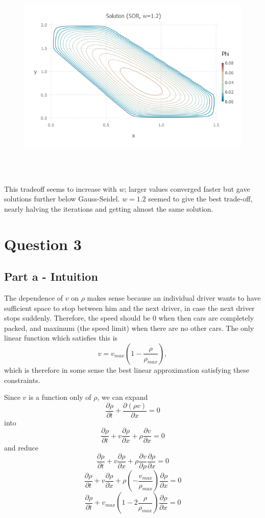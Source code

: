 \documentclass{article}
\begin{document}
\begin{figure}[H]
	\includegraphics[width=6in,height=4in]{"q2_sor_solution"}
\end{figure}

This tradeoff seems to increase with $w$; larger values converged faster but gave solutions further below Gauss-Seidel. $w=1.2$ seemed to give the best trade-off, nearly halving the iterations and getting almost the same solution.

\section{Question 3}
\subsection{Part a - Intuition}
The dependence of $v$ on $\rho$ makes sense because an individual driver wants to have sufficient space to stop between him and the next driver, in case the next driver stops suddenly. Therefore, the speed should be 0 when then cars are completely packed, and maximum (the speed limit) when there are no other cars. The only linear function which satisfies this is
$$v = v_{max}(1-\frac{\rho}{\rho_{max}}),$$
which is therefore in some sense the best linear approximation satisfying these constraints.

Since $v$ is a function only of $\rho$, we can expand
$$\frac{\partial \rho}{\partial t} + \frac{\partial (\rho v)}{\partial x} = 0$$
into
$$\frac{\partial \rho}{\partial t} + v\frac{\partial \rho}{\partial x} +  \rho\frac{\partial v}{\partial x}= 0$$
and reduce
$$\frac{\partial \rho}{\partial t} + v\frac{\partial \rho}{\partial x} +  \rho\frac{\partial v}{\partial \rho}\frac{\partial \rho}{\partial x}= 0$$
$$\frac{\partial \rho}{\partial t} + v\frac{\partial \rho}{\partial x} +  \rho(-\frac{v_{max}}{\rho_{max}})\frac{\partial \rho}{\partial x}= 0$$
$$\frac{\partial \rho}{\partial t} + v_{max}(1 - 2\frac{\rho}{\rho_{max}})\frac{\partial \rho}{\partial x}= 0$$
\end{document}
